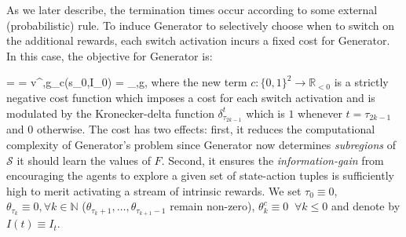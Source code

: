 \documentclass{article}
\makeatletter
\newenvironment{smalleralign}[1][\small]
 {\par\nopagebreak\leavevmode\vspace*{-\baselineskip}%
  \skip0=\abovedisplayskip
  #1%
  \def\maketag@@@##1{\hbox{\m@th\normalfont\normalsize##1}}%
  \abovedisplayskip=\skip0
  \align}
 {\endalign\ignorespacesafterend}
\makeatother
\begin{document}
As we later describe, the termination times occur according to some external (probabilistic) rule. To induce {\selectfont Generator} to selectively choose when to switch on the additional rewards, each switch activation  incurs a fixed cost for {\selectfont Generator}. In this case, the objective for {\selectfont Generator} is: 
\begin{smalleralign}
v^{\boldsymbol{\pi},g}_c(s_0,I_0)  = _{\boldsymbol{\pi},g}\left[ \sum_{t=0}^\infty \gamma^t\left(R^{\boldsymbol{\theta}}(s_t,\boldsymbol{a}_t) +\sum_{k\geq 1} c(I_t,I_{t-1})\delta^t_{\tau_{2k-1}}
+L(s_t,\boldsymbol{a}_t)\right)\right], \label{generator_objective}
\end{smalleralign} 
where the new term $c:\{0,1\}^2\to \mathbb{R}_{<0}$ is a strictly negative cost function which imposes a cost for each switch activation and is modulated by the Kronecker-delta function $\delta^t_{\tau_{2k-1}}$ which is $1$ whenever $t={\tau_{2k-1}}$ and $0$ otherwise. The cost has two effects: first, it reduces the computational complexity of {\selectfont Generator}'s problem since {\selectfont Generator} now determines \textit{subregions} of $\mathcal{S}$ it should learn the values of $F$. Second, it ensures the \textit{information-gain} from encouraging the agents to explore a given set of state-action tuples is sufficiently high to merit activating a stream of intrinsic rewards. 
% 
% 
%  
% 
% 
% 
% 
% 
We set $\tau_0\equiv 0$,  $\theta_{\tau_k}\equiv 0,\forall k\in\mathbb{N}$ ($\theta_{\tau_k+1},\ldots, \theta_{\tau_{k+1}-1}$ remain non-zero), $\theta^c_k\equiv 0\;\; \forall k\leq 0$ 
% 
and denote by $I(t)\equiv I_t$.
% 
\end{document}

